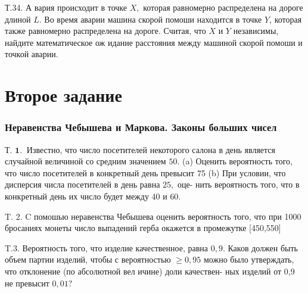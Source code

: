 \documentclass[a4paper,12pt]{article} %
\begin{document}
\begin{example}


Т.34. А вария происходит в точке $X,$ которая равномерно распределена на дороге длиной $L .$ Во время аварии машина скорой помоши находится в точке $Y$, которая также равномерно распределена на дороге. Считая,
что $X$ и $Y$ независимы, найдите математическое ож идание расстояния между машиной скорой помоши и точкой аварии.



\end{example}







\clearpage
\part{Второе задание}


\section{Неравенства Чебышева и Маркова. Законы больших чисел}

\begin{example}

Т. $\mathbf{1 . ~}$ Известно, что число посетителей некоторого салона в день является случайной величиной со средним значением $50 .$
(a) Оценить вероятность того, что число посетителей в конкретный день превысит 75
(b) При условии, что дисперсия числа посетителей в день равна $25,$ оце-
нить вероятность того, что в конкретный день их число будет между 40 и $60 .$




\end{example}



\begin{example}

T. 2. $\mathrm{C}$ помошью неравенства Чебышева оценить вероятность того, что при 1000 бросаниях монеты число выпадений герба окажется в промежутке [450,550]




\end{example}



\begin{example}

T.3. Вероятность того, что изделие качественное, равна $0,9 .$ Каков должен быть объем партии изделий, чтобы с вероятностью $\geq 0,95$ можно было утверждать, что отклонение (по абсолютной вел ичине) доли качествен-
ных изделий от 0,9 не превысит $0,01 ?$




\end{example}
\end{document}
